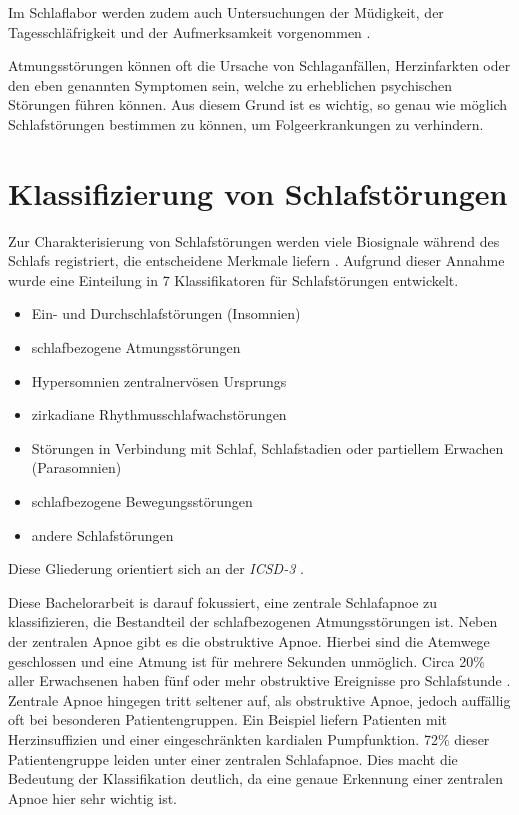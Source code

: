 Im Schlaflabor werden zudem auch Untersuchungen der Müdigkeit, der Tagesschläfrigkeit und der Aufmerksamkeit vorgenommen \cite{croenleinSchlafmedizin1x1Praxisorientiertes2017}.

Atmungsstörungen können oft die Ursache von Schlaganfällen, Herzinfarkten oder den eben genannten Symptomen sein, welche zu erheblichen psychischen Störungen führen können.
Aus diesem Grund ist es wichtig, so genau wie möglich Schlafstörungen bestimmen zu können, um Folgeerkrankungen zu verhindern. 

\section{Klassifizierung von Schlafstörungen}
\label{ch:Basics:se:classification}
Zur Charakterisierung von Schlafstörungen werden viele Biosignale während des Schlafs registriert, die entscheidene Merkmale liefern \cite{stuckPraxisSchlafmedizinDiagnostik2018}.
Aufgrund dieser Annahme wurde eine Einteilung in 7 Klassifikatoren für Schlafstörungen entwickelt.
\begin{itemize}
    \item Ein- und Durchschlafstörungen (Insomnien)
    \item schlafbezogene Atmungsstörungen
    \item Hypersomnien zentralnervösen Ursprungs
    \item zirkadiane Rhythmusschlafwachstörungen
    \item Störungen in Verbindung mit Schlaf, Schlafstadien oder partiellem Erwachen (Parasomnien)
    \item schlafbezogene Bewegungsstörungen
    \item andere Schlafstörungen
\end{itemize}

Diese Gliederung orientiert sich an der \textit{ICSD-3} \cite{stuckPraxisSchlafmedizinDiagnostik2018}.


Diese Bachelorarbeit is darauf fokussiert, eine zentrale Schlafapnoe zu klassifizieren, die Bestandteil der {\glqq schlafbezogenen Atmungsstörungen\grqq} ist.
Neben der zentralen Apnoe gibt es die obstruktive Apnoe. 
Hierbei sind die Atemwege geschlossen und eine Atmung ist für mehrere Sekunden unmöglich.
Circa 20\% aller Erwachsenen haben fünf oder mehr obstruktive Ereignisse pro Schlafstunde \cite{croenleinSchlafmedizin1x1Praxisorientiertes2017}.
Zentrale Apnoe hingegen tritt seltener auf, als obstruktive Apnoe, jedoch auffällig oft bei besonderen Patientengruppen. 
Ein Beispiel liefern Patienten mit Herzinsuffizien und einer eingeschränkten kardialen Pumpfunktion.
72\% dieser Patientengruppe leiden unter einer zentralen Schlafapnoe. 
Dies macht die Bedeutung der Klassifikation deutlich, da eine genaue Erkennung einer zentralen Apnoe hier sehr wichtig ist.

